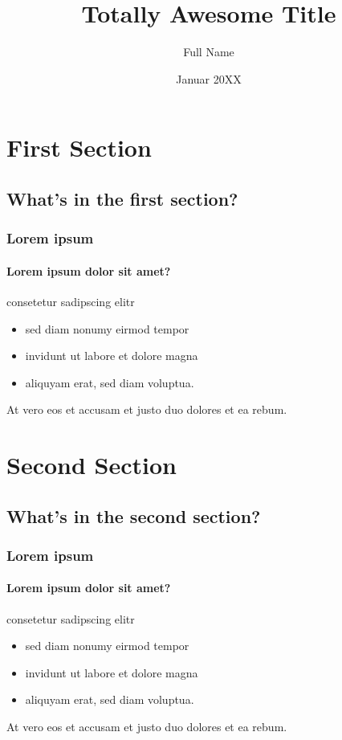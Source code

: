 \documentclass{beamer}
\title[Awesome Title] %
{Totally Awesome Title}
\subtitle {} %
\author[Short Name] %
{Full Name}
\institute[Short Institution] {
  Seminar Title\\
  Institution}
\date[Jan. 20XX]{Januar 20XX}
\begin{document}
\begin{frame}[plain]
  \titlepage
\end{frame}

%

\section{First Section}
\subsection{What's in the first section?}

\begin{frame}
	\frametitle{Lorem ipsum}
	\framesubtitle{Lorem ipsum dolor sit amet?}

	\begin{block}{consetetur sadipscing elitr}
		\begin{itemize}
			\item sed diam nonumy eirmod tempor
			\item invidunt ut labore et dolore magna
			\item aliquyam erat, sed diam voluptua.
		\end{itemize}

		At vero eos et accusam et justo duo dolores et ea rebum.
	\end{block}
\end{frame}

\section{Second Section}
\subsection{What's in the second section?}

\begin{frame}
	\frametitle{Lorem ipsum}
	\framesubtitle{Lorem ipsum dolor sit amet?}

	\begin{block}{consetetur sadipscing elitr}
		\begin{itemize}
			\item sed diam nonumy eirmod tempor
			\item invidunt ut labore et dolore magna
			\item aliquyam erat, sed diam voluptua.
		\end{itemize}

		At vero eos et accusam et justo duo dolores et ea rebum.
	\end{block}
\end{frame}
\end{document}
